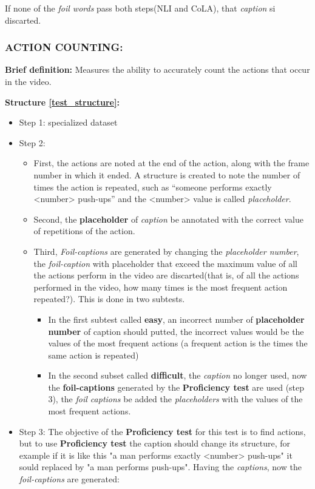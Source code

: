 If none of the \textit{foil words} pass both steps(NLI and CoLA), that \textit{caption} si discarted.

\subsubsection{ACTION COUNTING:}
\textbf{Brief definition:} Measures the ability to accurately count the actions that occur in the video.

\textbf{Structure \ref{test_structure}:}
\begin{itemize}
\item Step 1: specialized dataset
\item Step 2:
\begin{itemize}
\item First, the actions are noted at the end of the action, along with the frame number in which it ended. A structure is created to note the number of times the action is repeated, such as “someone performs exactly <number> push-ups” and the <number> value is called \textit{placeholder}.
\item Second, the \textbf{placeholder} of \textit{caption} be annotated with the correct value of repetitions of the action.
\item Third, \textit{Foil-captions} are generated by changing the \textit{placeholder number}, the \textit{foil-caption} with placeholder that exceed the maximum value of all the actions perform in the video are discarted(that is, of all the actions performed in the video, how many times is the most frequent action repeated?). This is done in two subtests.
\begin{itemize}
\item In the first subtest called \textbf{easy}, an incorrect number of \textbf{placeholder number} of caption should putted, the incorrect values would be the values of the most frequent actions (a frequent action is the times the same action is repeated)
\item In the second subset called \textbf{difficult}, the \textit{caption} no longer used, now the \textbf{foil-captions} generated by the \textbf{Proficiency test} are used (step 3), the \textit{foil captions} be added the \textit{placeholders} with the values of the most frequent actions.
\end{itemize}
\end{itemize} 
\item Step 3: The objective of the \textbf{Proficiency test} for this test is to find actions, but to use \textbf{Proficiency test} the caption should change its structure, for example if it is like this "a man performs exactly <number> push-ups" it sould replaced by  "a man performs push-ups". Having the \textit{captions}, now the \textit{foil-captions} are generated:

\end{itemize}
